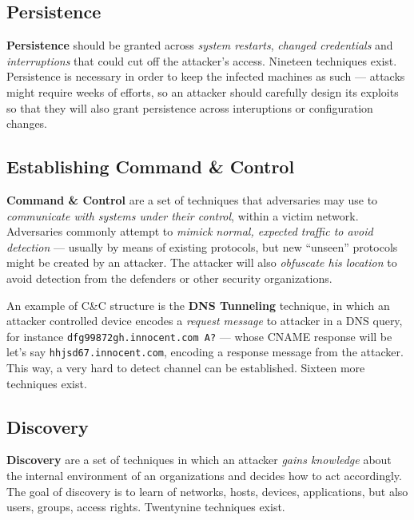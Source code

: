\documentclass[10pt]{extreport}
\begin{document}
\subsection{Persistence}

\textbf{Persistence} should be granted across \emph{system restarts},
\emph{changed credentials} and \emph{interruptions} that could cut off the
attacker's access. Nineteen techniques exist. Persistence is necessary in order
to keep the infected machines as such --- attacks might require weeks of
efforts, so an attacker should carefully design its exploits so that they will
also grant persistence across interuptions or configuration changes.

\subsection{Establishing Command \& Control}

\textbf{Command \& Control} are a set of techniques that adversaries may use
to \emph{communicate with systems under their control}, within a victim
network. Adversaries commonly attempt to \emph{mimick normal, expected traffic
to avoid detection} --- usually by means of existing protocols, but new
``unseen'' protocols might be created by an attacker. The attacker will also
\emph{obfuscate his location} to avoid detection from the defenders or other
security organizations.

An example of C\&C structure is the \textbf{DNS Tunneling} technique, in which
an attacker controlled device encodes a \emph{request message} to attacker in a
DNS query, for instance \texttt{dfg99872gh\-.innocent.com A?} --- whose CNAME
response will be let's say \texttt{hhjsd67\-.innocent.com}, encoding a response
message from the attacker. This way, a very hard to detect channel can be
established. Sixteen more techniques exist.

\subsection{Discovery}

\textbf{Discovery} are a set of techniques in which an attacker \emph{gains
knowledge} about the internal environment of an organizations and decides how
to act accordingly. The goal of discovery is to learn of networks, hosts, devices,
applications, but also users, groups, access rights. Twentynine techniques
exist.
\end{document}
